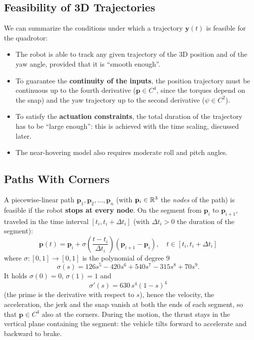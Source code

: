 \documentclass[10pt, a4paper]{report}
\newcommand{\y}{{\mathbf y}}
\begin{document}
\subsection{Feasibility of 3D Trajectories}
We can summarize the conditions under which a trajectory $\y(t)$ is feasible for the quadrotor:\begin{itemize}
    \item The robot is able to track any given trajectory of the 3D position and of the yaw angle, provided that it is ``smooth enough''.
    \item To guarantee the \textbf{continuity of the inputs}, the position trajectory must be continuous up to the fourth derivative ($\mathbf p\in C^4$, since the torques depend on the snap) and the yaw trajectory up to the second derivative ($\psi\in C^2$).
    \item To satisfy the \textbf{actuation constraints}, the total duration of the trajectory has to be ``large enough'': this is achieved with the time scaling, discussed later.
    \item The near-hovering model also requires moderate roll and pitch angles.
\end{itemize}
\subsection{Paths With Corners}
A piecewise-linear path $\mathbf p_1,\mathbf p_2,\dots,\mathbf p_n$ (with $\mathbf p_i\in{\mathbb R}^3$ the \textit{nodes} of the path) is feasible if the robot \textbf{stops at every node}. On the segment from $\mathbf p_i$ to $\mathbf p_{i+1}$, traveled in the time interval $[t_i,t_i+\Delta t_i]$ (with $\Delta t_i>0$ the duration of the segment):\begin{equation}
    \mathbf p(t)=\mathbf p_i+\sigma\left(\frac{t-t_i}{\Delta t_i}\right)(\mathbf p_{i+1}-\mathbf p_i),\quad t\in[t_i,t_i+\Delta t_i]
\end{equation}
where $\sigma:[0,1]\to[0,1]$ is the polynomial of degree 9\begin{equation}
    \sigma(s)=126s^5-420s^6+540s^7-315s^8+70s^9.
\end{equation}
It holds $\sigma(0)=0$, $\sigma(1)=1$ and\begin{equation}
    \sigma'(s)=630\,s^4(1-s)^4
\end{equation}
(the prime is the derivative with respect to $s$), hence the velocity, the acceleration, the jerk and the snap vanish at both the ends of each segment, so that $\mathbf p\in C^4$ also at the corners. During the motion, the thrust stays in the vertical plane containing the segment: the vehicle tilts forward to accelerate and backward to brake.\bigskip
\end{document}
